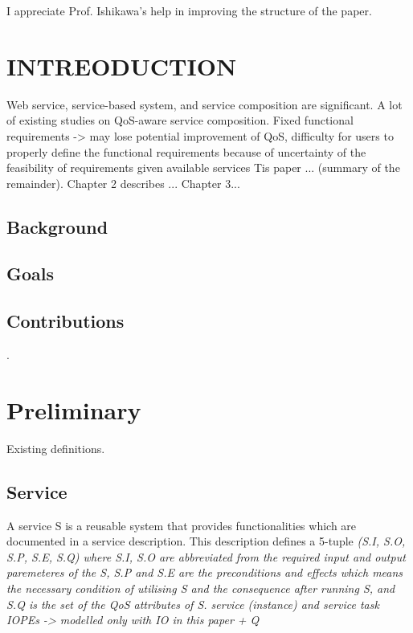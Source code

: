 \documentclass[senior,final,11pt]{iscs-thesis}
\begin{document}
\begin{acknowledge}
I appreciate Prof. Ishikawa's help in improving the structure of the paper.
\end{acknowledge}

\frontmatter 
\tableofcontents
\mainmatter 

\chapter{INTREODUCTION}
Web service, service-based system, and service composition are significant.
A lot of existing studies on QoS-aware service composition.
Fixed functional requirements -> may lose potential improvement of QoS, difficulty for users to properly define the functional requirements because of uncertainty of the feasibility of requirements given available services
Tis paper ... (summary of the remainder).
Chapter 2 describes ... Chapter 3...
\section{Background}
\section{Goals}
\section{Contributions}
\cite{4065825}. 
\chapter{Preliminary}%
Existing definitions.

\section{Service}
A service S is a reusable system that provides functionalities which are documented in a service description. This description defines a 5-tuple \em{(S.I, S.O, S.P, S.E, S.Q)} where \em{S.I, S.O} are abbreviated from the required input and output paremeteres of the S, S.P and S.E are the preconditions and effects which means the necessary condition of utilising S and the consequence after running S, and S.Q is the set of the QoS attributes of S. 
service (instance) and service task
IOPEs -> modelled only with IO in this paper
+ 
Q
\end{document}
